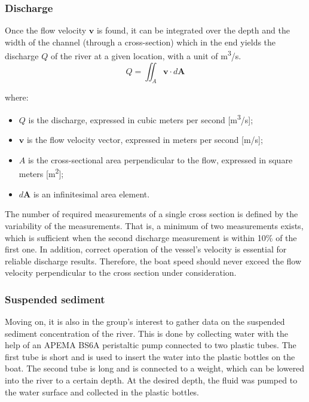 \subsubsection{Discharge}
Once the flow velocity \(\mathbf{v}\) is found, it can be integrated over the depth and the width of the channel (through a cross-section) which in the end yields the discharge \(Q\) of the river at a given location, with a unit of \si{\cubic\metre}/s.
\begin{equation}
    Q = \iint_A \mathbf{v} \cdot d\mathbf{A}
    \label{eq:discharge_integration}
\end{equation}

\noindent where:
\begin{itemize}
    \item \(Q\) is the discharge, expressed in cubic meters per second [m\textsuperscript{3}/s];
    \item \(\mathbf{v}\) is the flow velocity vector, expressed in meters per second [m/s];
    \item \(A\) is the cross-sectional area perpendicular to the flow, expressed in square meters [m\textsuperscript{2}];
    \item \(d\mathbf{A}\) is an infinitesimal area element.
\end{itemize}

The number of required measurements of a single cross section is defined by the variability of the measurements. That is, a minimum of two measurements exists, which is sufficient when the second discharge measurement is within 10\% of the first one. In addition, correct operation of the vessel's velocity is essential for reliable discharge results. Therefore, the boat speed should never exceed the flow velocity perpendicular to the cross section under consideration. 






\subsubsection{Suspended sediment}
Moving on, it is also in the group's interest to gather data on the suspended sediment concentration of the river. This is done by collecting water with the help of an APEMA BS6A peristaltic pump connected to two plastic tubes. The first tube is short and is used to insert the water into the plastic bottles on the boat. The second tube is long and is connected to a weight, which can be lowered into the river to a certain depth. At the desired depth, the fluid was pumped to the water surface and collected in the plastic bottles.

